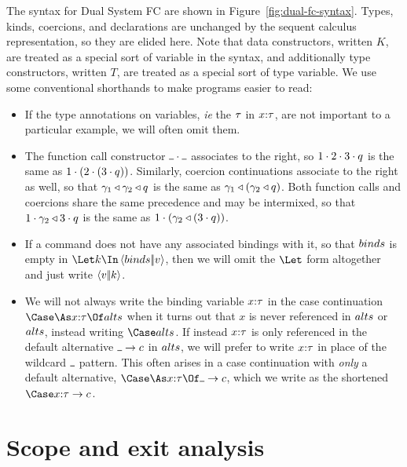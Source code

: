 \documentclass{article}
\begin{document}
The syntax for Dual System FC are shown in
Figure~\ref{fig:dual-fc-syntax}.  Types, kinds, coercions, and
declarations are unchanged by the sequent calculus representation, so
they are elided here.  Note that data constructors, written $K$, are
treated as a special sort of variable in the syntax, and additionally
type constructors, written $T$, are treated as a special sort of type
variable.  We use some conventional shorthands to make programs easier
to read:
\begin{itemize}
\item If the type annotations on variables, \emph{ie} the $\tau$ in
  $x{:}{\tau}$, are not important to a particular example, we will
  often omit them.
\item The function call constructor $\app{\blank}{\blank}$ associates
  to the right, so ${1}\cdot{{2}\cdot{{3}\cdot{q}}}$ is the same as
  ${1}\cdot{({2}\cdot{({3}\cdot{q})})}$.  Similarly, coercion
  continuations associate to the right as well, so that
  ${\gamma_1}\triangleleft{{\gamma_2}\triangleleft{q}}$ is the same as
  ${\gamma_1}\triangleleft{({\gamma_2}\triangleleft{q})}$.  Both function calls and
  coercions share the same precedence and may be intermixed, so that
  ${1}\cdot{{\gamma_2}\triangleleft{{3}\cdot{q}}}$ is the same as
  ${1}\cdot{({\gamma_2}\triangleleft{({3}\cdot{q})})}$.
\item If a command does not have any associated bindings with it, so
  that $binds$ is empty in $\mcut{\binds}{\tm}{\ko}$, then we will
  omit the $\Let$ form altogether and just write $\left\langle{v}\middle|\!\middle|{k}\right\rangle$.
\item We will not always write the binding variable $x{:}{\tau}$ in
  the case continuation $\caseas{\ann x \ty}{\alts}$ when it turns out
  that $x$ is never referenced in $alts$ or $alts$, instead writing
  $\Case\alts$.  If instead $x{:}{\tau}$ is only referenced in the
  default alternative $\alt{\blank}{\com}$ in $alts$, we will prefer
  to write $x{:}{\tau}$ in place of the wildcard $\blank$ pattern.
  This often arises in a case continuation with \emph{only} a default
  alternative, $\caseas{\ann x \ty}{\alt{\blank}{\com}}$, which we
  write as the shortened $\Case\alt{\ann x \ty}{\com}$.
\end{itemize}

\section{Scope and exit analysis}
\label{sec:scope-analysis}
\end{document}

